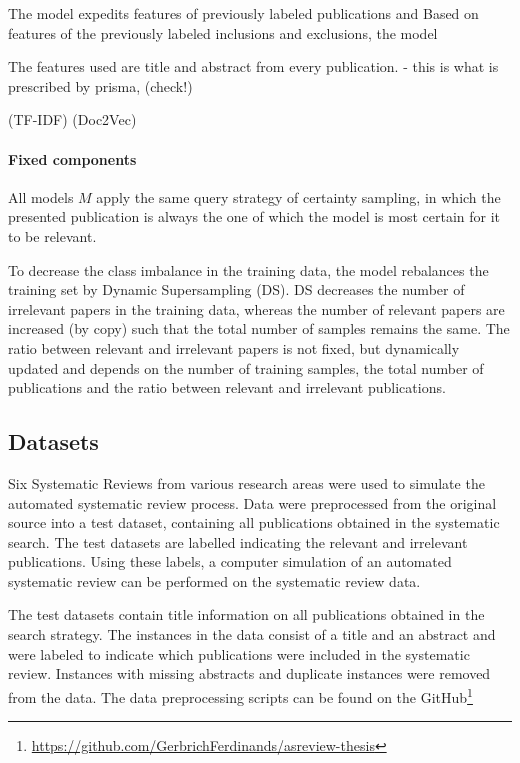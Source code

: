 \documentclass[
]{article}
\begin{document}
The model expedits features of previously labeled publications and Based
on features of the previously labeled inclusions and exclusions, the
model

The features used are title and abstract from every publication. - this
is what is prescribed by prisma, (check!)

(TF-IDF) (Doc2Vec)

\hypertarget{fixed-components}{%
\paragraph{Fixed components}\label{fixed-components}}

All models \(M\) apply the same query strategy of certainty sampling, in
which the presented publication is always the one of which the model is
most certain for it to be relevant.

To decrease the class imbalance in the training data, the model
rebalances the training set by Dynamic Supersampling (DS). DS decreases
the number of irrelevant papers in the training data, whereas the number
of relevant papers are increased (by copy) such that the total number of
samples remains the same. The ratio between relevant and irrelevant
papers is not fixed, but dynamically updated and depends on the number
of training samples, the total number of publications and the ratio
between relevant and irrelevant publications.

\hypertarget{datasets}{%
\subsection{Datasets}\label{datasets}}

Six Systematic Reviews from various research areas were used to simulate
the automated systematic review process. Data were preprocessed from the
original source into a test dataset, containing all publications
obtained in the systematic search. The test datasets are labelled
indicating the relevant and irrelevant publications. Using these labels,
a computer simulation of an automated systematic review can be performed
on the systematic review data.

The test datasets contain title information on all publications obtained
in the search strategy. The instances in the data consist of a title and
an abstract and were labeled to indicate which publications were
included in the systematic review. Instances with missing abstracts and
duplicate instances were removed from the data. The data preprocessing
scripts can be found on the GitHub\footnote{\url{https://github.com/GerbrichFerdinands/asreview-thesis}}
\end{document}

